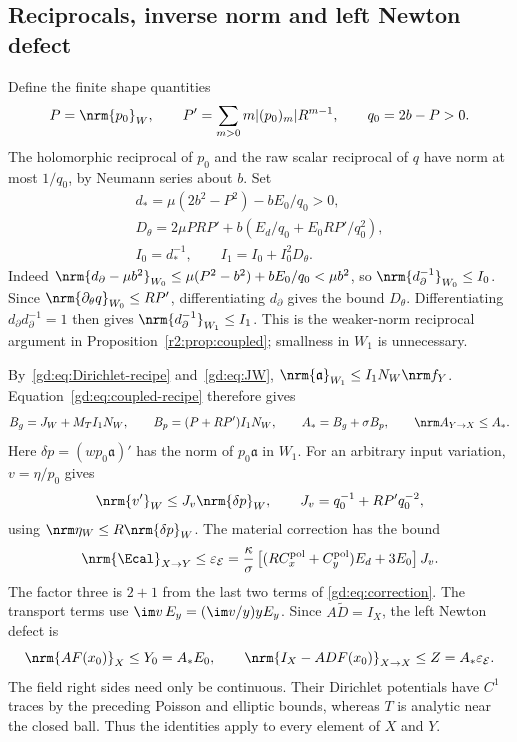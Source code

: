 \subsection{Reciprocals, inverse norm and left Newton defect}
\label{gd:sec:inverse-bounds}
Define the finite shape quantities
\[
 P=\nrm{p_0}_W,\qquad
 P'=\sum_{m>0}m|(p_0)_m|R^{m-1},\qquad q_0=2b-P>0 .
\]
The holomorphic reciprocal of $p_0$ and the raw scalar reciprocal
of $q$ have norm at most $1/q_0$, by Neumann series about $b$.
Set
\begin{equation}\label{gd:eq:boundary-reciprocal}
 \begin{gathered}
 d_*=\mu(2b^2-P^2)-bE_0/q_0>0,\\
 D_\theta=2\mu PRP'+b(E_d/q_0+E_0RP'/q_0^2),\\
 I_0=d_*^{-1},\qquad I_1=I_0+I_0^2D_\theta .
 \end{gathered}
\end{equation}
Indeed
$\nrm{d_\partial-\mu b^2}_{W_0}\le\mu(P^2-b^2)+bE_0/q_0<\mu b^2$,
so $\nrm{d_\partial^{-1}}_{W_0}\le I_0$.
Since $\nrm{\partial_\theta q}_{W_0}\le RP'$,
differentiating $d_\partial$ gives the bound $D_\theta$.
Differentiating $d_\partial d_\partial^{-1}=1$ then gives
$\nrm{d_\partial^{-1}}_{W_1}\le I_1$.
This is the weaker-norm reciprocal argument in
Proposition~\ref{r2:prop:coupled}; smallness in $W_1$ is unnecessary.

By~\eqref{gd:eq:Dirichlet-recipe} and~\eqref{gd:eq:JW},
$\nrm{\mathfrak a}_{W_1}\le I_1N_W\nrm f_Y$.
Equation~\eqref{gd:eq:coupled-recipe} therefore gives
\begin{equation}\label{gd:eq:A}
 B_g=J_W+M_TI_1N_W,\qquad
 B_p=(P+RP')I_1N_W,\qquad A_*=B_g+\sigma B_p,\qquad
 \nrm A_{Y\to X}\le A_* .
\end{equation}
Here $\delta p=(wp_0\mathfrak a)'$ has the norm of $p_0\mathfrak a$ in $W_1$.
For an arbitrary input variation, $v=\eta/p_0$ gives
\begin{equation}\label{gd:eq:Jv}
 \nrm{v'}_W\le J_v\nrm{\delta p}_W,\qquad
 J_v=q_0^{-1}+RP'q_0^{-2},
\end{equation}
using $\nrm\eta_W\le R\nrm{\delta p}_W$.
The material correction has the bound
\begin{equation}\label{gd:eq:epsilon}
 \nrm{\Ecal}_{X\to Y}\le\varepsilon_{\mathcal E}
 =\frac{\kappa}{\sigma}
       \left[(RC_x^{\rm pol}+C_y^{\rm pol})E_d+3E_0\right]J_v .
\end{equation}
The factor three is $2+1$ from the last two terms of
\eqref{gd:eq:correction}. The transport terms use
$\im v\,E_y=(\im v/y)yE_y$.
Since $A\widetilde D=I_X$, the left Newton defect is
\begin{equation}\label{gd:eq:Newton}
 \nrm{AF(x_0)}_X\le Y_0=A_*E_0,\qquad
 \nrm{I_X-ADF(x_0)}_{X\to X}\le Z=A_*\varepsilon_{\mathcal E} .
\end{equation}
The field right sides need only be continuous.
Their Dirichlet potentials have $C^1$ traces by the preceding
Poisson and elliptic bounds, whereas $T$ is analytic near the closed
ball. Thus the identities apply to every element of $X$ and $Y$.

